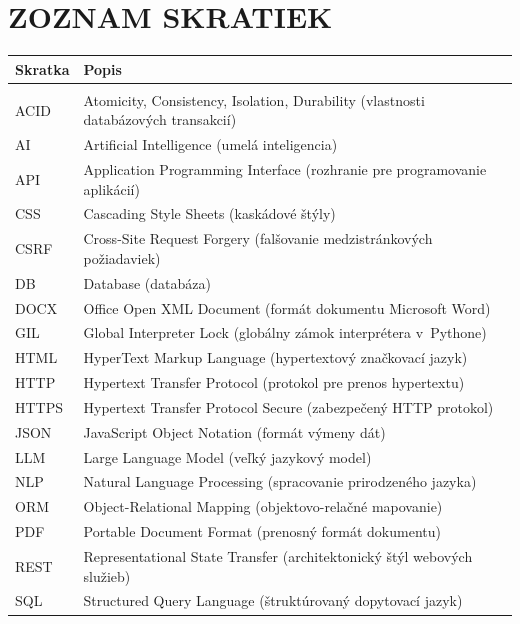 \chapter*{ZOZNAM SKRATIEK}

\begin{tabular}{p{2.8cm} p{11.5cm}}
  \textbf{Skratka} & \textbf{Popis} \\[4pt]
  \midrule\\[-6pt]
  ACID   & Atomicity, Consistency, Isolation, Durability (vlastnosti databázových transakcií) \\[3pt]
  AI     & Artificial Intelligence (umelá inteligencia) \\[3pt]
  API    & Application Programming Interface (rozhranie pre programovanie aplikácií) \\[3pt]
  CSS    & Cascading Style Sheets (kaskádové štýly) \\[3pt]
  CSRF   & Cross-Site Request Forgery (falšovanie medzistránkových požiadaviek) \\[3pt]
  DB     & Database (databáza) \\[3pt]
  DOCX   & Office Open XML Document (formát dokumentu Microsoft Word) \\[3pt]
  GIL    & Global Interpreter Lock (globálny zámok interprétera v~Pythone) \\[3pt]
  HTML   & HyperText Markup Language (hypertextový značkovací jazyk) \\[3pt]
  HTTP   & Hypertext Transfer Protocol (protokol pre prenos hypertextu) \\[3pt]
  HTTPS  & Hypertext Transfer Protocol Secure (zabezpečený HTTP protokol) \\[3pt]
  JSON   & JavaScript Object Notation (formát výmeny dát) \\[3pt]
  LLM    & Large Language Model (veľký jazykový model) \\[3pt]
  NLP    & Natural Language Processing (spracovanie prirodzeného jazyka) \\[3pt]
  ORM    & Object-Relational Mapping (objektovo-relačné mapovanie) \\[3pt]
  PDF    & Portable Document Format (prenosný formát dokumentu) \\[3pt]
  REST   & Representational State Transfer (architektonický štýl webových služieb) \\[3pt]
  SQL    & Structured Query Language (štruktúrovaný dopytovací jazyk) \\[3pt]

\end{tabular}
